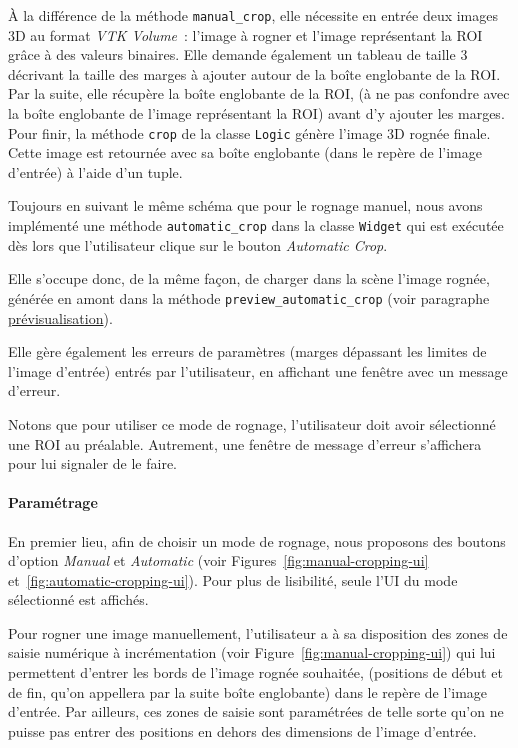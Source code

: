 \documentclass{article}
\newcommand{\subsubsubsection}[1]{\paragraph{#1}\par\noindent\bigskip}
\begin{document}
{{{{                À la différence de la méthode \texttt{manual\_crop}, elle nécessite en entrée deux images 3D au format \textit{VTK Volume}~: l'image à rogner et l'image représentant la ROI grâce à des valeurs binaires. Elle demande également un tableau de taille 3 décrivant la taille des marges à ajouter autour de la boîte englobante de la ROI.
                Par la suite, elle récupère la boîte englobante de la ROI, (à ne pas confondre avec la boîte englobante de l'image représentant la ROI) avant d'y ajouter les marges.
                Pour finir, la méthode \texttt{crop} de la classe \texttt{Logic} génère l'image 3D rognée finale. Cette image est retournée avec sa boîte englobante (dans le repère de l'image d'entrée) à l'aide d'un tuple.

                \bigskip

                Toujours en suivant le même schéma que pour le rognage manuel, nous avons implémenté une méthode \texttt{automatic\_crop} dans la classe \texttt{Widget} qui est exécutée dès lors que l'utilisateur clique sur le bouton \textit{Automatic Crop}.

                Elle s'occupe donc, de la même façon, de charger dans la scène l'image rognée, générée en amont dans la méthode \texttt{preview\_automatic\_crop} (voir paragraphe \hyperref[subsubsubsec:cropping-preview]{prévisualisation}).

                Elle gère également les erreurs de paramètres (marges dépassant les limites de l'image d'entrée) entrés par l'utilisateur, en affichant une fenêtre avec un message d'erreur.

                Notons que pour utiliser ce mode de rognage, l'utilisateur doit avoir sélectionné une ROI au préalable. Autrement, une fenêtre de message d'erreur s'affichera pour lui signaler de le faire.
            }

            {
                \bigskip
                \subsubsubsection{Paramétrage}

                En premier lieu, afin de choisir un mode de rognage, nous proposons des boutons d'option \textit{Manual} et \textit{Automatic} (voir Figures~\ref{fig:manual-cropping-ui} et~\ref{fig:automatic-cropping-ui}). Pour plus de lisibilité, seule l'UI du mode sélectionné est affichés.

                \bigskip

                Pour rogner une image manuellement, l'utilisateur a à sa disposition des zones de saisie numérique à incrémentation (voir Figure~\ref{fig:manual-cropping-ui}) qui lui permettent d'entrer les bords de l'image rognée souhaitée, (positions de début et de fin, qu'on appellera par la suite boîte englobante) dans le repère de l'image d'entrée. Par ailleurs, ces zones de saisie sont paramétrées de telle sorte qu'on ne puisse pas entrer des positions en dehors des dimensions de l'image d'entrée.

}}}}
\end{document}
